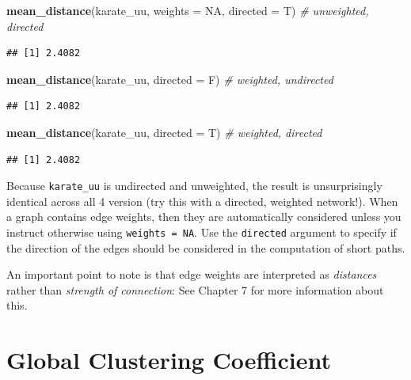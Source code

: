 \documentclass[
]{book}
\newenvironment{Shaded}{\begin{snugshade}}{\end{snugshade}}
\newcommand{\AttributeTok}[1]{\textcolor[rgb]{0.13,0.29,0.53}{#1}}
\newcommand{\CommentTok}[1]{\textcolor[rgb]{0.56,0.35,0.01}{\textit{#1}}}
\newcommand{\ConstantTok}[1]{\textcolor[rgb]{0.56,0.35,0.01}{#1}}
\newcommand{\FunctionTok}[1]{\textcolor[rgb]{0.13,0.29,0.53}{\textbf{#1}}}
\newcommand{\NormalTok}[1]{#1}
\begin{document}
\begin{Shaded}
\begin{Highlighting}[]
\FunctionTok{mean\_distance}\NormalTok{(karate\_uu, }\AttributeTok{weights =} \ConstantTok{NA}\NormalTok{, }\AttributeTok{directed =}\NormalTok{ T) }\CommentTok{\# unweighted, directed }
\end{Highlighting}
\end{Shaded}

\begin{verbatim}
## [1] 2.4082
\end{verbatim}

\begin{Shaded}
\begin{Highlighting}[]
\FunctionTok{mean\_distance}\NormalTok{(karate\_uu, }\AttributeTok{directed =}\NormalTok{ F) }\CommentTok{\# weighted, undirected}
\end{Highlighting}
\end{Shaded}

\begin{verbatim}
## [1] 2.4082
\end{verbatim}

\begin{Shaded}
\begin{Highlighting}[]
\FunctionTok{mean\_distance}\NormalTok{(karate\_uu, }\AttributeTok{directed =}\NormalTok{ T) }\CommentTok{\# weighted, directed }
\end{Highlighting}
\end{Shaded}

\begin{verbatim}
## [1] 2.4082
\end{verbatim}

Because \texttt{karate\_uu} is undirected and unweighted, the result is unsurprisingly identical across all 4 version (try this with a directed, weighted network!). When a graph contains edge weights, then they are automatically considered unless you instruct otherwise using \texttt{weights\ =\ NA}. Use the \texttt{directed} argument to specify if the direction of the edges should be considered in the computation of short paths.

An important point to note is that edge weights are interpreted as \emph{distances} rather than \emph{strength of connection}: See Chapter 7 for more information about this.

\section{Global Clustering Coefficient}\label{global-clustering-coefficient}
\end{document}
